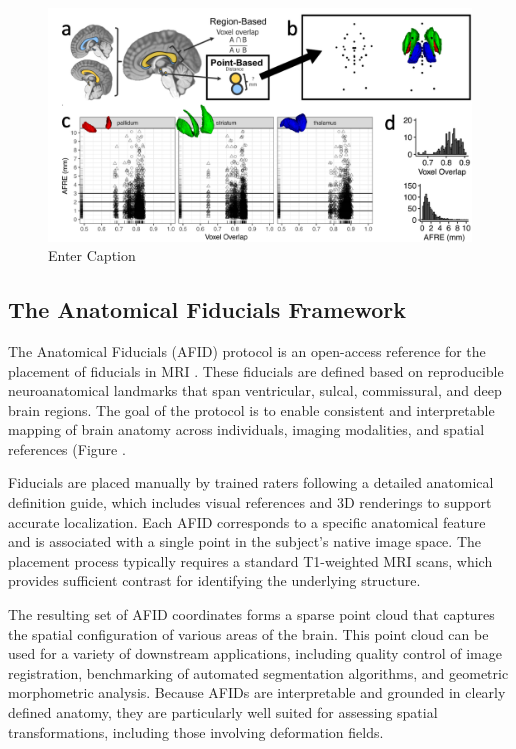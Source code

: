 \begin{figure}[hbt!]
    \centering
    \includegraphics[width=1\linewidth]{figs/ch1_Figure_afidsvsoverlap.png}
    \caption{Enter Caption}
    \label{fig:enter-label}
\end{figure}

\subsection{The Anatomical Fiducials Framework}
The Anatomical Fiducials (AFID) protocol is an open-access reference for the placement of fiducials in MRI \cite{Lau2019-eh}. These fiducials are defined based on reproducible neuroanatomical landmarks that span ventricular, sulcal, commissural, and deep brain regions. The goal of the protocol is to enable consistent and interpretable mapping of brain anatomy across individuals, imaging modalities, and spatial references (Figure .

Fiducials are placed manually by trained raters following a detailed anatomical definition guide, which includes visual references and 3D renderings to support accurate localization. Each AFID corresponds to a specific anatomical feature and is associated with a single point in the subject's native image space. The placement process typically requires a standard T1-weighted MRI scans, which provides sufficient contrast for identifying the underlying structure.

The resulting set of AFID coordinates forms a sparse point cloud that captures the spatial configuration of various areas of the brain. This point cloud can be used for a variety of downstream applications, including quality control of image registration, benchmarking of automated segmentation algorithms, and geometric morphometric analysis. Because AFIDs are interpretable and grounded in clearly defined anatomy, they are particularly well suited for assessing spatial transformations, including those involving deformation fields.


